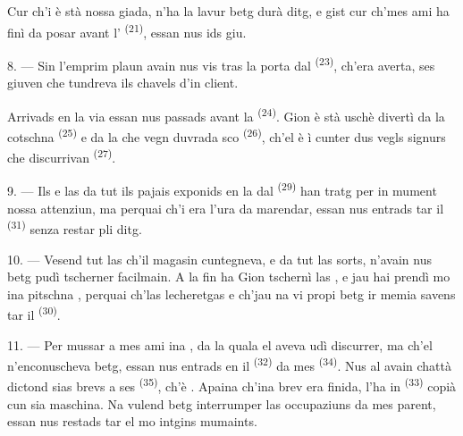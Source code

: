 Cur ch'i è stà nossa giada, n'ha la lavur betg durà ditg, e gist cur ch'mes ami ha
finì da posar avant l' \textsuperscript{(21)}, essan nus ids giu.

8. --- Sin l'emprim plaun avain nus vis tras la porta dal 
\textsuperscript{(23)}, ch'era averta, ses giuven che tundreva ils chavels d'in client.

Arrivads en la via essan nus passads avant la 
\textsuperscript{(24)}. Gion è stà uschè divertì da la cotschna 
\textsuperscript{(25)} e da la  che vegn duvrada sco 
\textsuperscript{(26)}, ch'el è ì cunter dus vegls signurs che discurrivan
 \textsuperscript{(27)}.

\VUsaut{3.0mm}

9. --- Ils  e las  da tut ils pajais exponids
en la  dal  \textsuperscript{(29)} han tratg per in mument
nossa attenziun, ma perquai ch'i era l'ura da marendar, essan nus entrads tar il
 \textsuperscript{(31)} senza restar pli ditg.

10. --- Vesend tut las  ch'il magasin cuntegneva,  e  da tut las sorts, n'avain nus betg pudì
tscherner facilmain. A la fin ha Gion tschernì las , e jau hai
prendì mo ina pitschna , perquai ch'las lecheretgas
 e ch'jau na vi propi betg ir memia savens tar il
 \textsuperscript{(30)}.

\VUsaut{3.0mm}

11. --- Per mussar a mes ami ina , da la quala el aveva udì
discurrer, ma ch'el n'enconuscheva betg, essan nus entrads en il 
\textsuperscript{(32)} da mes  \textsuperscript{(34)}. Nus al avain chattà
dictond sias brevs a ses  \textsuperscript{(35)}, ch'è .
Apaina ch'ina brev era finida, l'ha in  \textsuperscript{(33)} copià cun
sia
maschina. Na vulend betg interrumper las occupaziuns da mes parent, essan nus restads
tar el mo intgins mumaints.

